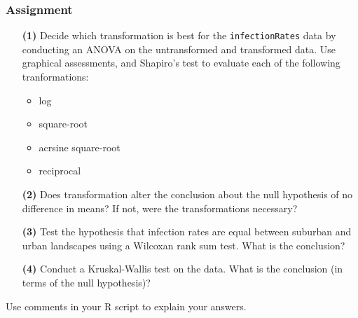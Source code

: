 \documentclass[color=usenames,dvipsnames]{beamer}\usepackage[]{graphicx}\usepackage[]{color}
\newcommand{\inr}[1]{\colorbox{inlinecolor}{\texttt{#1}}}
\begin{document}




\begin{frame}
  \frametitle{Assignment}
  \small
  \begin{enumerate}
    \item[\bf (1)] Decide which transformation is best for the
      \inr{infectionRates} data by conducting an ANOVA on the
      untransformed and transformed data. Use graphical assessments,
      and Shapiro's test to evaluate each of the
      following tranformations:
      \begin{itemize}
        \item log
        \item square-root
        \item acrsine square-root
        \item reciprocal
      \end{itemize}
    \item[\bf (2)] Does transformation alter the conclusion about the
      null hypothesis of no difference in means? If not, were the
      transformations necessary?
    \item[\bf (3)] Test the hypothesis that infection rates are equal
      between suburban and urban landscapes using a Wilcoxan rank sum
      test. What is the conclusion?
    \item[\bf (4)] Conduct a Kruskal-Wallis test on the data. What
      is the conclusion (in terms of the null hypothesis)?
  \end{enumerate}
  \centering
  Use comments in your R script to explain your answers. \\
\end{frame}
\end{document}
